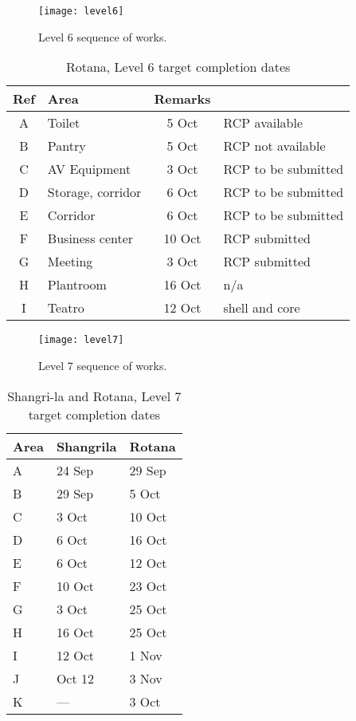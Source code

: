 \begin{figure*}[htbp]
 \texttt{[image: level6]}
  \caption{Level 6 sequence of works.}
  \label{fig:level6}
\end{figure*}
\begin{table}[htbp]
\begin{center}
\begin{tabular}{clcl}
\toprule
Ref  & Area  & Remarks \\
\midrule
A    &Toilet   &5 Oct & RCP available  \\
B     &Pantry  &5 Oct &  RCP not available \\
C     &AV Equipment & 3 Oct &RCP to be submitted  \\
D     &Storage, corridor & 6 Oct & RCP to be submitted \\
E      &Corridor &6 Oct & RCP to be submitted \\
F     &Business center&10 Oct & RCP submitted \\
G    &Meeting &3 Oct & RCP submitted \\
H    &Plantroom &16 Oct & n/a \\
I     &Teatro &12 Oct & shell and core \\
\bottomrule
\end{tabular}
\caption{Rotana,  Level 6  target completion dates}
\end{center}
\end{table}
\eject





\begin{figure*}[htbp]
 \texttt{[image: level7]}
  \caption{Level 7 sequence of works.}
  \label{fig:level7}
\end{figure*}


\begin{table}[htbp]
\begin{center}
\begin{tabular}{lll}
\toprule
Area  & Shangrila  & Rotana \\
\midrule
A       &24 Sep & 29 Sep \\
B       &29 Sep & 5 Oct  \\
C      & 3 Oct & 10 Oct \\
D      & 6 Oct & 16 Oct \\
E      &6 Oct & 12 Oct \\
F      &10 Oct & 23 Oct \\
G     &3 Oct & 25 Oct \\
H     &16 Oct & 25 Oct \\
I      &12 Oct & 1 Nov \\
J     &Oct 12 & 3 Nov \\
K    &--- & 3 Oct \\
\bottomrule
\end{tabular}
\caption{Shangri-la and Rotana,  Level 7  target completion dates}
\end{center}
\end{table}

